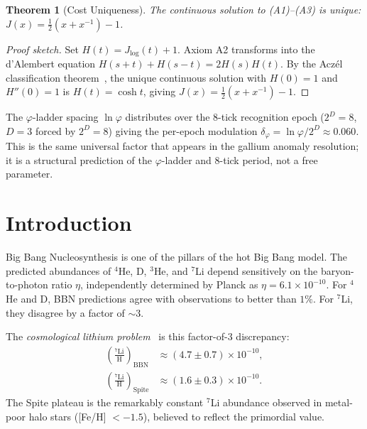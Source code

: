 \documentclass[12pt,a4paper]{article}
\newtheorem{theorem}{Theorem}[section]
\theoremstyle{definition}
\theoremstyle{remark}
\begin{document}
\begin{theorem}[Cost Uniqueness]
\label{thm:unique}
The continuous solution to \textup{(A1)--(A3)} is unique:
$J(x) = \tfrac{1}{2}(x + x^{-1}) - 1$.
\end{theorem}

\begin{proof}[Proof sketch]
Set $H(t) = J_{\log}(t)+1$.  Axiom A2 transforms into the d'Alembert
equation $H(s+t)+H(s-t)=2H(s)H(t)$.  By the Acz\'el classification
theorem~\cite{Aczel1966}, the unique continuous solution with $H(0)=1$
and $H''(0)=1$ is $H(t)=\cosh t$, giving
$J(x)=\tfrac{1}{2}(x+x^{-1})-1$.
\end{proof}

\noindent The $\varphi$-ladder spacing $\ln\varphi$ distributes over the
8-tick recognition epoch ($2^D=8$, $D=3$ forced by $2^D=8$) giving the
per-epoch modulation $\delta_\varphi = \ln\varphi/2^D \approx 0.060$.
This is the same universal factor that appears in the gallium anomaly
resolution; it is a structural prediction of the $\varphi$-ladder and
8-tick period, not a free parameter.

\section{Introduction}
\label{sec:intro}

Big Bang Nucleosynthesis is one of the pillars of the hot Big Bang
model.  The predicted abundances of $^4$He, D, $^3$He, and $^7$Li
depend sensitively on the baryon-to-photon ratio $\eta$, independently
determined by Planck as $\eta = 6.1 \times 10^{-10}$.  For $^4$He and
D, BBN predictions agree with observations to better than $1\%$.  For
$^7$Li, they disagree by a factor of $\sim 3$.

The \emph{cosmological lithium problem}~\cite{Spite1982,Cyburt2016} is
this factor-of-3 discrepancy:
\begin{align}
  \left(\frac{^7\mathrm{Li}}{\mathrm{H}}\right)_{\mathrm{BBN}}
  &\approx (4.7 \pm 0.7) \times 10^{-10}, \\
  \left(\frac{^7\mathrm{Li}}{\mathrm{H}}\right)_{\mathrm{Spite}}
  &\approx (1.6 \pm 0.3) \times 10^{-10}.
\end{align}
The Spite plateau is the remarkably constant $^7$Li abundance observed
in metal-poor halo stars ([Fe/H] $< -1.5$), believed to reflect the
primordial value.
\end{document}

